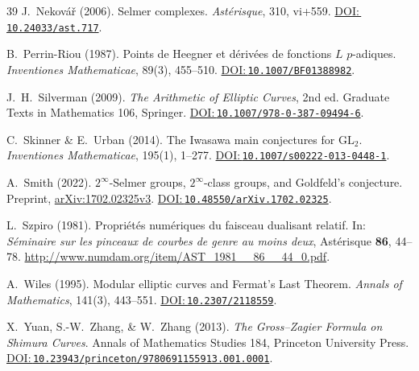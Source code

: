 \documentclass[aps,prd,twocolumn,superscriptaddress,nofootinbib,floatfix]{revtex4-2}
\newcommand{\doilink}[1]{\href{https://doi.org/#1}{DOI:\,\nolinkurl{#1}}}
\theoremstyle{definition}
\theoremstyle{remark}
\begin{document}
\begin{thebibliography}{39}
J.~Nekovář (2006).
Selmer complexes.
\textit{Astérisque}, 310, vi+559.
\doilink{10.24033/ast.717}.

B.~Perrin-Riou (1987).
Points de Heegner et dérivées de fonctions $L$ $p$-adiques.
\textit{Inventiones Mathematicae}, 89(3), 455--510.
\doilink{10.1007/BF01388982}.

J.~H.~Silverman (2009).
\textit{The Arithmetic of Elliptic Curves}, 2nd ed.
Graduate Texts in Mathematics 106, Springer.
\doilink{10.1007/978-0-387-09494-6}.

C.~Skinner \& E.~Urban (2014).
The Iwasawa main conjectures for $\mathrm{GL}_2$.
\textit{Inventiones Mathematicae}, 195(1), 1--277.
\doilink{10.1007/s00222-013-0448-1}.

A.~Smith (2022).
$2^\infty$-Selmer groups, $2^\infty$-class groups, and Goldfeld's conjecture.
Preprint, \href{https://arxiv.org/abs/1702.02325v3}{arXiv:1702.02325v3}.
\doilink{10.48550/arXiv.1702.02325}.

L.~Szpiro (1981).
Propriétés numériques du faisceau dualisant relatif.
In: \textit{Séminaire sur les pinceaux de courbes de genre au moins deux},
Astérisque \textbf{86}, 44--78.
\url{http://www.numdam.org/item/AST_1981__86__44_0.pdf}.

A.~Wiles (1995).
Modular elliptic curves and Fermat's Last Theorem.
\textit{Annals of Mathematics}, 141(3), 443--551.
\doilink{10.2307/2118559}.

X.~Yuan, S.-W.~Zhang, \& W.~Zhang (2013).
\textit{The Gross--Zagier Formula on Shimura Curves}.
Annals of Mathematics Studies 184, Princeton University Press.
\doilink{10.23943/princeton/9780691155913.001.0001}.

\end{thebibliography}
\end{document}
